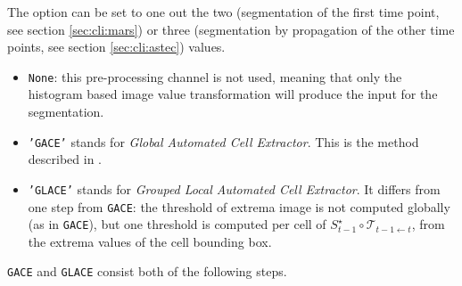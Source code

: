 The option  can be set to one out the two (segmentation of the first time point, see section \ref{sec:cli:mars}) or three (segmentation by propagation of the other time points, see section \ref{sec:cli:astec}) values.

\begin{itemize}
\itemsep -0.5ex
\item \texttt{None}: this pre-processing channel is not used, meaning that only the histogram based image value transformation will produce the input for the segmentation.
\item \texttt{'GACE'} stands for \textit{Global Automated Cell Extractor}. This is the method described in \cite{michelin:hal-00915000,michelin:tel-01451608}.
\item \texttt{'GLACE'} stands for \textit{Grouped Local Automated Cell Extractor}. It differs from one step from \texttt{GACE}: the threshold of extrema image is not computed globally (as in \texttt{GACE}), but one threshold is computed per cell of $S^{\star}_{t-1} \circ \mathcal{T}_{t-1 \leftarrow t}$, from the extrema values of the cell bounding box.
\end{itemize}

\texttt{GACE} and \texttt{GLACE} consist both of the following steps.

